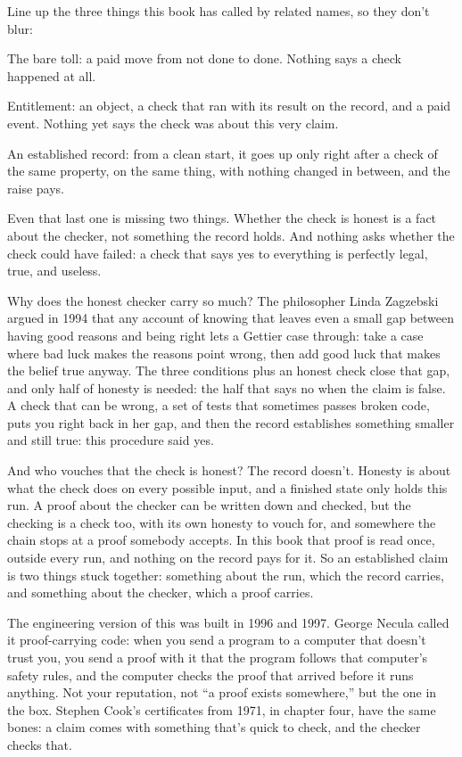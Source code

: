 \documentclass[11pt,twoside]{article}
\theoremstyle{thielethm}
\theoremstyle{thieledef}
\theoremstyle{thieledef}
\theoremstyle{thieledef}
\theoremstyle{thielethm}
\theoremstyle{thieleobs}
\theoremstyle{thielethm}
\begin{document}
Line up the three things this book has called by related names, so they don't blur:

The bare toll: a paid move from not done to done. Nothing says a check happened at all.

Entitlement: an object, a check that ran with its result on the record, and a paid event. Nothing yet says the check was about this very claim.

An established record: from a clean start, it goes up only right after a check of the same property, on the same thing, with nothing changed in between, and the raise pays.

Even that last one is missing two things. Whether the check is honest is a fact about the checker, not something the record holds. And nothing asks whether the check could have failed: a check that says yes to everything is perfectly legal, true, and useless.

Why does the honest checker carry so much? The philosopher Linda Zagzebski argued in 1994 that any account of knowing that leaves even a small gap between having good reasons and being right lets a Gettier case through: take a case where bad luck makes the reasons point wrong, then add good luck that makes the belief true anyway. The three conditions plus an honest check close that gap, and only half of honesty is needed: the half that says no when the claim is false. A check that can be wrong, a set of tests that sometimes passes broken code, puts you right back in her gap, and then the record establishes something smaller and still true: this procedure said yes.

And who vouches that the check is honest? The record doesn't. Honesty is about what the check does on every possible input, and a finished state only holds this run. A proof about the checker can be written down and checked, but the checking is a check too, with its own honesty to vouch for, and somewhere the chain stops at a proof somebody accepts. In this book that proof is read once, outside every run, and nothing on the record pays for it. So an established claim is two things stuck together: something about the run, which the record carries, and something about the checker, which a proof carries.

The engineering version of this was built in 1996 and 1997. George Necula called it proof-carrying code: when you send a program to a computer that doesn't trust you, you send a proof with it that the program follows that computer's safety rules, and the computer checks the proof that arrived before it runs anything. Not your reputation, not ``a proof exists somewhere,'' but the one in the box. Stephen Cook's certificates from 1971, in chapter four, have the same bones: a claim comes with something that's quick to check, and the checker checks that.
\end{document}
